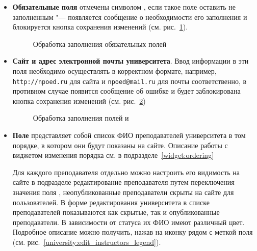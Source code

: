	\begin{itemize}
		\item \textbf{Обязательные поля} отмечены символом \quotes{*}, если такое поле оставить не заполненным "--- появляется сообщение о необходимости его заполнения и блокируется кнопка сохранения изменений (см. рис.~\ref{university:edit_required}).
		
		\begin{figure}[H]
		\caption{Обработка заполнения обязательных полей}
		\label{university:edit_required}
		\end{figure}	
	
		\item \textbf{Сайт и адрес электронной почты университета}. Ввод информации в эти поля необходимо осуществлять в корректном формате, например, \texttt{http://npoed.ru} для сайта и \texttt{npoed@mail.ru} для почты соответственно, в противном случае появится сообщение об ошибке и будет заблокирована кнопка сохранения изменений (см. рис.~\ref{university:edit_url_email})
		
		\begin{figure}[H]
		\caption{Обработка заполнения полей  и }
		\label{university:edit_url_email}
		\end{figure}	
		
		\item \textbf{Поле } представляет собой список ФИО преподавателей университета в том порядке, в котором они будут показаны на сайте. Описание работы с виджетом изменения порядка см. в подразделе~\ref{widget:ordering}

		Для каждого преподавателя отдельно можно настроить его видимость на сайте в подразделе редактирование преподавателя путем переключения значения поля , неопубликованные преподаватели скрыты на сайте для пользователей. В форме редактирования университета в списке преподавателей показываются как скрытые, так и опубликованные преподаватели. В зависимости от статуса их ФИО имеют различный цвет. Подробное описание можно получить, нажав на иконку  рядом с меткой поля (см. рис.~\ref{university:edit_instructors_legend}).
		

\end{itemize}
